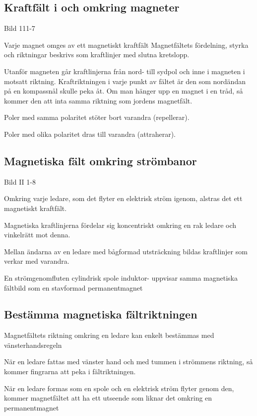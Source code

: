 \subsection{Kraftfält i och omkring magneter}

Bild 111-7

Varje magnet omges av ett magnetiskt kraftfält Magnetfältets fördelning, styrka och
riktningar beskrivs som kraftlinjer med slutna kretslopp.

Utanför magneten går kraftlinjerna från nord- till sydpol och inne i magneten i motsatt
riktning. Kraftriktningen i varje punkt av fältet är den som nordändan på en kompassnål
skulle peka åt. Om man hänger upp en magnet i en tråd, så kommer den att inta
samma riktning som jordens magnetfält.

Poler med samma polaritet stöter bort varandra (repellerar).

Poler med olika polaritet dras till varandra (attraherar).

\subsection{Magnetiska fält omkring strömbanor}

Bild II 1-8

Omkring varje ledare, som det flyter en elektrisk ström igenom, alstras det ett
magnetiskt kraftfält.

Magnetiska kraftlinjerna fördelar sig koncentriskt omkring en rak ledare och vinkelrätt
mot denna.

Mellan ändarna av en ledare med bågformad utsträckning bildas kraftlinjer som verkar med
varandra.

En strömgenomfluten cylindrisk spole induktor- uppvisar samma magnetiska fältbild som en stavformad permanentmagnet

\subsection{Bestämma magnetiska fältriktningen}

Magnetfältets riktning omkring en ledare kan enkelt bestämmas med vänsterhandsregeln

När en ledare fattas med vänster hand och med tummen i strömmens riktning, så
kommer fingrarna att peka i fältriktningen.

När en ledare formas som en spole och en elektrisk ström flyter genom den, kommer
magnetfältet att ha ett utseende som liknar det omkring en permanentmagnet

